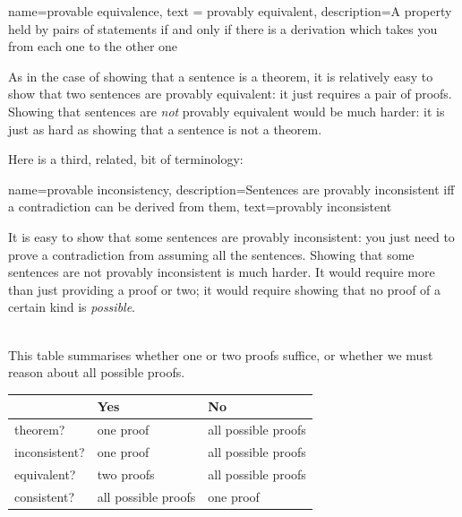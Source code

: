 {
  name=provable equivalence,
  text = provably equivalent,
description={A property held by pairs of statements if and only if there is a derivation which takes you from each one to the other one}
}


As in the case of showing that a sentence is a theorem, it is relatively easy to show that two sentences are provably equivalent: it just requires a pair of proofs. Showing that sentences are \emph{not} provably equivalent would be much harder: it is just as hard as showing that a sentence is not a theorem. 

Here is a third, related, bit of terminology:
        
{    name={provable inconsistency}, 
  description={Sentences are provably inconsistent iff a contradiction can be derived from them},
    text={provably inconsistent}
}

        It is easy to show that some sentences are provably inconsistent: you just need to prove a contradiction from assuming all the sentences. Showing that some sentences are not provably inconsistent is much harder. It would require more than just providing a proof or two; it would require showing that no proof of a certain kind is \emph{possible}.

\
\\
This table summarises whether one or two proofs suffice, or whether we must reason about all possible proofs.

\begin{center}
\begin{tabular}{l l l}
 & \textbf{Yes} & \textbf{No}\\
 \hline
theorem? & one proof & all possible proofs\\
inconsistent? &  one proof  & all possible proofs\\
equivalent? & two proofs & all possible proofs\\
consistent? & all possible proofs & one proof\\
\end{tabular}
\end{center}


